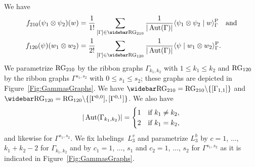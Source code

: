 \documentclass[\MainFolder/Text.tex]{subfiles}
\begin{document}
\begin{Example}\label{Ex:Canon}
We have
\begin{equation}\label{Eq:DefByGraphs}
\begin{aligned}
f_{210}(\psi_1 \otimes \psi_2)(w) & = \frac{1}{1!} \sum_{[\Gamma]\in \RRG_{210}} \frac{1}{\Abs{\Aut(\Gamma)}} \langle \psi_1 \otimes \psi_2 \mid w \rangle_\Gamma^{\Prpg}\quad\text{and} \\
f_{120}(\psi)(w_1 \otimes w_2) & = \frac{1}{2!} \sum_{[\Gamma]\in \RRG_{120}} \frac{1}{\Abs{\Aut(\Gamma)}} \langle \psi \mid w_1 \otimes w_2 \rangle_\Gamma^{\Prpg}.
\end{aligned}
\end{equation}
We parametrize $\mathrm{RG}_{210}$ by the ribbon graphs $\Gamma_{k_1, k_2}$ with $1\le k_1\le k_2$ and $\mathrm{RG}_{120}$ by the ribbon graphs $\Gamma^{s_1, s_2}$ with $0\le s_1 \le s_2$; these graphs are depicted in Figure~\ref{Fig:GammasGraphs}. We have 
$\RRG_{210} = \RG_{210}\backslash \{[\Gamma_{1,1}]\}$ and $\RRG_{120} = \RG_{120}\backslash \{[\Gamma^{0,0}], [\Gamma^{0,1}]\}$. We also have 
\[|\operatorname{Aut}(\Gamma_{k_1,k_2})| = \begin{cases} 1 & \text{if }k_1 \neq k_2, \\ 
              2 & \text{if }k_1 = k_2, \end{cases}\]
and likewise for $\Gamma^{s_1,s_2}$. We fix labelings~$L_{3}^v$ and parametrize $L_{3}^b$ by $c=1$, $\dotsc$, $k_1 + k_2 - 2$ for $\Gamma_{k_1,k_2}$ and by $c_1 = 1$, $\dotsc$, $s_1$ and $c_2 = 1$, $\dotsc$, $s_2$ for $\Gamma^{s_1,s_2}$ as it is indicated in Figure~\ref{Fig:GammasGraphs}.


\end{Example}
\end{document}
